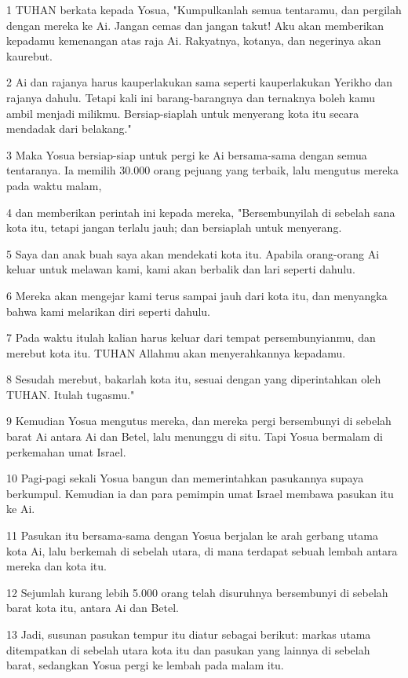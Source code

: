 \par 1 TUHAN berkata kepada Yosua, "Kumpulkanlah semua tentaramu, dan pergilah dengan mereka ke Ai. Jangan cemas dan jangan takut! Aku akan memberikan kepadamu kemenangan atas raja Ai. Rakyatnya, kotanya, dan negerinya akan kaurebut.
\par 2 Ai dan rajanya harus kauperlakukan sama seperti kauperlakukan Yerikho dan rajanya dahulu. Tetapi kali ini barang-barangnya dan ternaknya boleh kamu ambil menjadi milikmu. Bersiap-siaplah untuk menyerang kota itu secara mendadak dari belakang."
\par 3 Maka Yosua bersiap-siap untuk pergi ke Ai bersama-sama dengan semua tentaranya. Ia memilih 30.000 orang pejuang yang terbaik, lalu mengutus mereka pada waktu malam,
\par 4 dan memberikan perintah ini kepada mereka, "Bersembunyilah di sebelah sana kota itu, tetapi jangan terlalu jauh; dan bersiaplah untuk menyerang.
\par 5 Saya dan anak buah saya akan mendekati kota itu. Apabila orang-orang Ai keluar untuk melawan kami, kami akan berbalik dan lari seperti dahulu.
\par 6 Mereka akan mengejar kami terus sampai jauh dari kota itu, dan menyangka bahwa kami melarikan diri seperti dahulu.
\par 7 Pada waktu itulah kalian harus keluar dari tempat persembunyianmu, dan merebut kota itu. TUHAN Allahmu akan menyerahkannya kepadamu.
\par 8 Sesudah merebut, bakarlah kota itu, sesuai dengan yang diperintahkan oleh TUHAN. Itulah tugasmu."
\par 9 Kemudian Yosua mengutus mereka, dan mereka pergi bersembunyi di sebelah barat Ai antara Ai dan Betel, lalu menunggu di situ. Tapi Yosua bermalam di perkemahan umat Israel.
\par 10 Pagi-pagi sekali Yosua bangun dan memerintahkan pasukannya supaya berkumpul. Kemudian ia dan para pemimpin umat Israel membawa pasukan itu ke Ai.
\par 11 Pasukan itu bersama-sama dengan Yosua berjalan ke arah gerbang utama kota Ai, lalu berkemah di sebelah utara, di mana terdapat sebuah lembah antara mereka dan kota itu.
\par 12 Sejumlah kurang lebih 5.000 orang telah disuruhnya bersembunyi di sebelah barat kota itu, antara Ai dan Betel.
\par 13 Jadi, susunan pasukan tempur itu diatur sebagai berikut: markas utama ditempatkan di sebelah utara kota itu dan pasukan yang lainnya di sebelah barat, sedangkan Yosua pergi ke lembah pada malam itu.
